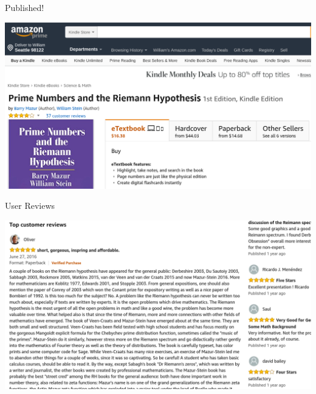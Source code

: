 \documentclass{beamer}
\begin{document}
\begin{frame}{Published!}

  \includegraphics[width=.98\textwidth]{pics/amazon-prime}

\end{frame}



\begin{frame}{User Reviews}

  \includegraphics[width=\textwidth]{pics/amazon-review}

  \hrulefill

  \vfill


\end{frame}
\end{document}
